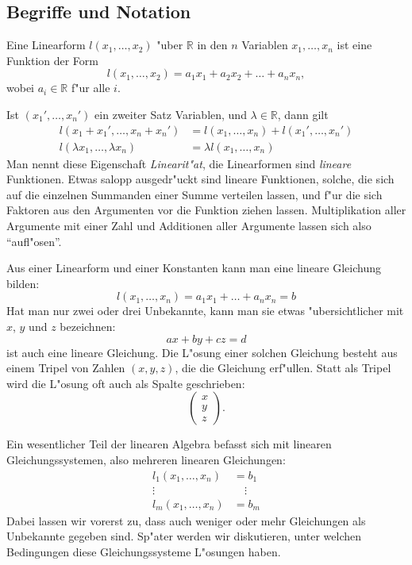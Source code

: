 \subsection{Begriffe und Notation}
\begin{definition}
Eine Linearform $l(x_1,\dots,x_2)$ "uber $\mathbb R$ in den $n$
Variablen $x_1,\dots,x_n$
ist eine Funktion der Form
\[
l(x_1,\dots,x_2)=a_1x_1+a_2x_2+\dots+a_nx_n,
\]
wobei $a_i\in\mathbb R$ f"ur alle $i$.
\end{definition}
Ist $(x_1',\dots,x_n')$ ein zweiter Satz Variablen, und $\lambda\in\mathbb R$,
dann gilt
\begin{equation}
\begin{aligned}
l(x_1+x_1',\dots,x_n+x_n')&=l(x_1,\dots, x_n)+l(x_1',\dots,x_n')\\
l(\lambda x_1, \dots ,\lambda x_n)&=\lambda l(x_1,\dots,x_n)
\end{aligned}
\label{linearitaet-linearformen}
\end{equation}
Man nennt diese Eigenschaft {\em Linearit"at}, die Linearformen sind
{\em lineare} Funktionen.
%
Etwas salopp ausgedr"uckt sind lineare Funktionen, solche, die sich
auf die einzelnen Summanden einer Summe verteilen lassen, und f"ur
die sich Faktoren aus den Argumenten vor die Funktion ziehen lassen.
Multiplikation aller Argumente mit einer Zahl und Additionen aller
Argumente lassen sich also ``aufl"osen''.

Aus einer Linearform und einer Konstanten kann man eine
lineare Gleichung bilden:
\[
l(x_1,\dots,x_n)=a_1x_1+\dots +a_nx_n=b
\]
Hat man nur zwei oder drei Unbekannte, kann man sie etwas "ubersichtlicher
mit $x$, $y$ und $z$ bezeichnen:
\[
ax+by+cz=d
\]
ist auch eine lineare Gleichung.
Die L"osung einer solchen Gleichung
besteht aus einem Tripel von Zahlen $(x,y,z)$, die die Gleichung erf"ullen.
Statt als Tripel wird die L"osung oft auch als Spalte geschrieben:
\[
\begin{pmatrix}
x\\y\\z
\end{pmatrix}.
\]

Ein wesentlicher Teil der linearen Algebra befasst sich mit linearen
Gleichungssystemen, also mehreren linearen Gleichungen:
\begin{align*}
l_1(x_1,\dots,x_n)&=b_1\\
\vdots\qquad\qquad&\quad\vdots\\
l_m(x_1,\dots,x_n)&=b_m
\end{align*}
Dabei lassen wir vorerst zu, dass auch weniger oder mehr Gleichungen
als Unbekannte gegeben sind.
Sp"ater werden wir diskutieren, unter
welchen Bedingungen diese Gleichungssysteme L"osungen haben.

